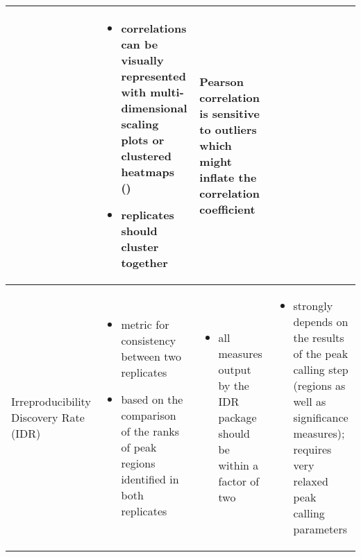 \begin{landscape}
\begin{singlespacing}
\begin{small}
\begin{longtable}{>{\textsf\bgroup\raggedleft\arraybackslash}p{2cm}<{\egroup} >{\textsf\bgroup}p{6.5cm}<{\egroup} >{\textsf\bgroup}p{6.1cm}<{\egroup}>{\textsf\bgroup}p{6.7cm}<{\egroup}}
\begin{minipage}{6.5cm}
\begin{itemize}[noitemsep,leftmargin=*]
				\end{itemize}
				\vskip 4pt
			\end{minipage}
			& \begin{minipage}{6.1cm}
					\begin{itemize}[noitemsep,leftmargin=*]
						\item correlations can be visually represented with multi-dimensional scaling plots \citep{Planet2012} or clustered heatmaps (\aref{SuppPub_deepTools})
						\item replicates should cluster together
					\end{itemize}
			\end{minipage}
			& \begin{minipage}{6.7cm}
					Pearson correlation is sensitive to outliers which might inflate the correlation coefficient \citep{Bailey2013}
			\end{minipage}
\tabularnewline  \midrule %
\begin{minipage}{2cm}
				\raggedright Ir\-re\-pro\-duci\-bi\-lity Discovery Rate (IDR)
\end{minipage}
			&	\begin{minipage}{6.5cm}
				\begin{itemize}[noitemsep,leftmargin=*]
					\item metric for consistency between two replicates \citep{Li2011}
					\item based on the comparison of the ranks of peak regions identified in both replicates
				\end{itemize}
			\end{minipage}
			& \begin{minipage}{6.1cm}
					\begin{itemize}[noitemsep,leftmargin=*]
						\item all measures output by the IDR package should be within a factor of two \citep{Landt2012}
							\end{itemize}
			\end{minipage}
			& \begin{minipage}{6.7cm}
\vskip 6pt
					\begin{itemize}[noitemsep,leftmargin=*]
					\item strongly depends on the results of the peak calling step (regions as well as significance measures); requires very relaxed peak calling parameters \citep{Li2011, Bailey2013}

\end{itemize}
\end{minipage}
\end{longtable}
\end{small}
\end{singlespacing}
\end{landscape}
